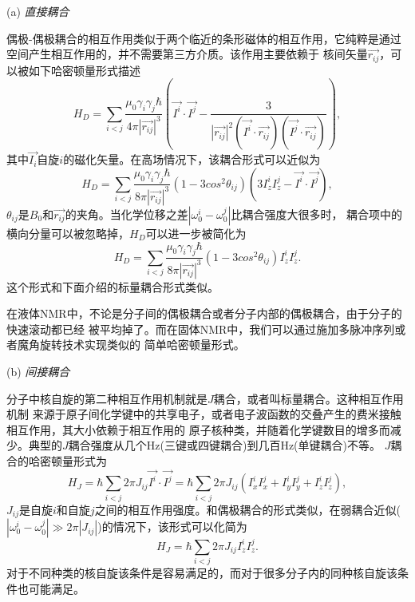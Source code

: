(a) \emph{直接耦合}

偶极-偶极耦合的相互作用类似于两个临近的条形磁体的相互作用，它纯粹是通过空间产生相互作用的，并不需要第三方介质。该作用主要依赖于
核间矢量$\overrightarrow{r_{ij}}$，可以被如下哈密顿量形式描述
\begin{equation}\label{static}
H_D = \sum_{i<j} \frac{\mu_0\gamma_i \gamma_j \hbar}{4\pi |\overrightarrow{r_{ij}}|^3}(\overrightarrow{I^i}\cdot \overrightarrow{I^j}-\frac{3}{|\overrightarrow{r_{ij}}|^2(\overrightarrow{I^i}\cdot\overrightarrow{r_{ij}})(\overrightarrow{I^j}\cdot\overrightarrow{r_{ij}})}),
\end{equation}
其中$\overrightarrow{I_{i}}$自旋$i$的磁化矢量。在高场情况下，该耦合形式可以近似为
\begin{equation}\label{static}
H_D = \sum_{i<j} \frac{\mu_0\gamma_i \gamma_j \hbar}{8\pi |\overrightarrow{r_{ij}}|^3}(1-3cos^2\theta_{ij})(3I_z^i I_z^j-\overrightarrow{I^i}\cdot\overrightarrow{I^j}),
\end{equation}
$\theta_{ij}$是$B_0$和$\overrightarrow{r_{ij}}$的夹角。当化学位移之差$|\omega_0^i-\omega_0^j|$比耦合强度大很多时，
耦合项中的横向分量可以被忽略掉，$H_D$可以进一步被简化为
\begin{equation}\label{static}
H_D = \sum_{i<j} \frac{\mu_0\gamma_i \gamma_j \hbar}{8\pi |\overrightarrow{r_{ij}}|^3}(1-3cos^2\theta_{ij})I_z^i I_z^j.
\end{equation}
这个形式和下面介绍的标量耦合形式类似。

在液体NMR中，不论是分子间的偶极耦合或者分子内部的偶极耦合，由于分子的快速滚动都已经
被平均掉了。而在固体NMR中，我们可以通过施加多脉冲序列\cite{Haeberlen}或者魔角旋转技术实现类似的
简单哈密顿量形式。

(b) \emph{间接耦合}

分子中核自旋的第二种相互作用机制就是$J$耦合，或者叫标量耦合。这种相互作用机制
来源于原子间化学键中的共享电子，或者电子波函数的交叠产生的费米接触相互作用，其大小依赖于相互作用的
原子核种类，并随着化学键数目的增多而减少。典型的$J$耦合强度从几个Hz(三键或四键耦合)到几百Hz(单键耦合)不等。
$J$耦合的哈密顿量形式为
\begin{equation}\label{static}
H_J = \hbar\sum_{i<j} 2\pi J_{ij} \overrightarrow{I^i}\cdot\overrightarrow{I^j}=\hbar\sum_{i<j} 2\pi J_{ij}(I_x^iI_x^j+I_y^iI_y^j+I_z^iI_z^j),
\end{equation}
$J_{ij}$是自旋$i$和自旋$j$之间的相互作用强度。和偶极耦合的形式类似，在弱耦合近似($|\omega_0^i-\omega_0^j|\gg 2\pi |J_{ij}|$)的情况下，该形式可以化简为
\begin{equation}\label{Jappro}
H_J =\hbar\sum_{i<j} 2\pi J_{ij}I_z^iI_z^j.
\end{equation}
对于不同种类的核自旋该条件是容易满足的，而对于很多分子内的同种核自旋该条件也可能满足。

